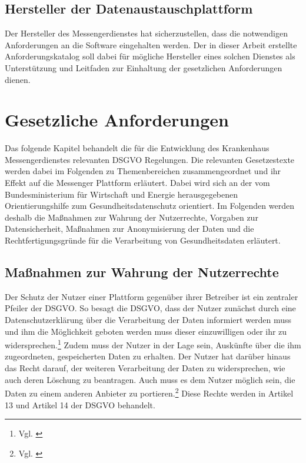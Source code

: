 \subsection{Hersteller der Datenaustauschplattform}\label{subsection:hdd}
Der Hersteller des Messengerdienstes hat sicherzustellen, dass die notwendigen Anforderungen an die Software eingehalten werden.
Der in dieser Arbeit erstellte Anforderungskatalog soll dabei für mögliche Hersteller eines solchen Dienstes als Unterstützung und Leitfaden zur Einhaltung der gesetzlichen Anforderungen dienen.

\section{Gesetzliche Anforderungen}\label{section:dsgvo}
Das folgende Kapitel behandelt die für die Entwicklung des Krankenhaus Messengerdienstes relevanten DSGVO Regelungen. Die relevanten Gesetzestexte werden dabei im Folgenden zu Themenbereichen zusammengeordnet und ihr Effekt auf die Messenger Plattform erläutert. Dabei wird sich an der vom Bundesministerium für Wirtschaft und Energie herausgegebenen Orientierungshilfe zum Gesundheitsdatenschutz orientiert. Im Folgenden werden deshalb die Maßnahmen zur Wahrung der Nutzerrechte, Vorgaben zur Datensicherheit, Maßnahmen zur Anonymisierung der Daten und die Rechtfertigungsgründe für die Verarbeitung von Gesundheitsdaten erläutert.

\subsection{Maßnahmen zur Wahrung der Nutzerrechte}\label{subsection:mzwdn}
Der Schutz der Nutzer einer Plattform gegenüber ihrer Betreiber ist ein zentraler Pfeiler der DSGVO. So besagt die DSGVO, dass der Nutzer zunächst durch eine Datenschutzerklärung über die Verarbeitung der Daten informiert werden muss und ihm die Möglichkeit geboten werden muss dieser einzuwilligen oder ihr zu widersprechen.\footnote{Vgl. \cite[S. 3]{Bundesaerztekammer2019}} Zudem muss der Nutzer in der Lage sein, Auskünfte über die ihm zugeordneten, gespeicherten Daten zu erhalten. Der Nutzer hat darüber hinaus das Recht darauf, der weiteren Verarbeitung der Daten zu widersprechen, wie auch deren Löschung zu beantragen. Auch muss es dem Nutzer möglich sein, die Daten zu einem anderen Anbieter zu portieren.\footnote{Vgl. \cite[S. 30 ff.]{Bundesaerztekammer2019}} Diese Rechte werden in Artikel 13 und Artikel 14 der DSGVO behandelt.

